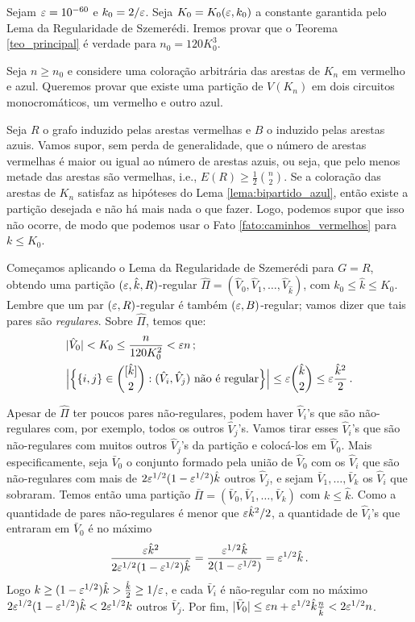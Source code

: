 Sejam $\varepsilon = 10^{-60}$ e $k_0 = 2/\varepsilon$. Seja $K_0 = K_0(\varepsilon, k_0)$ a constante garantida pelo Lema da Regularidade de Szemerédi. Iremos provar que o Teorema \ref{teo_principal} é verdade para $n_0 = 120K_0^3$.

Seja $n\geq n_0$ e considere uma coloração arbitrária das arestas de $K_n$ em vermelho e azul. Queremos provar que existe uma partição de $V(K_n)$ em dois circuitos monocromáticos, um vermelho e outro azul.

Seja $R$ o grafo induzido pelas arestas vermelhas e $B$ o induzido pelas arestas azuis. Vamos supor, sem perda de generalidade, que o número de arestas vermelhas é maior ou igual ao número de arestas azuis, ou seja, que pelo menos metade das arestas são vermelhas, i.e., $E(R)\geq \frac{1}{2}\binom{n}{2}$. 
Se a coloração das arestas de $K_n$ satisfaz as hipóteses do Lema \ref{lema:bipartido_azul}, então existe a partição desejada e não há mais nada o que fazer. Logo, podemos supor que isso não ocorre, de modo que podemos usar o Fato \ref{fato:caminhos_vermelhos} para $k\leq K_0$.

Começamos aplicando o Lema da Regularidade de Szemerédi para $G = R$, obtendo uma partição $(\varepsilon, \hat{k}, R)$-regular $\hat{\Pi} = (\hat{V}_0, \hat{V}_1, \dots, \hat{V}_{\hat{k}})$, com $k_0\leq \hat{k}\leq K_0$. Lembre que um par $(\varepsilon, R)$-regular é também $(\varepsilon, B)$-regular; vamos dizer que tais pares são \emph{regulares}. Sobre $\hat{\Pi}$, temos que:
\begin{align*}
	&|\hat{V}_0|<K_0\leq \frac{n}{120K_0^2}<\varepsilon n\,;\\
	&\Big|\Big\{\{i,j\}\in\binom{[\hat{k}]}{2}: (\hat{V}_i, \hat{V}_j) \text{ não é regular}\Big\}\Big| \leq \varepsilon\binom{\hat{k}}{2}\leq \varepsilon\frac{\hat{k}^2}{2}\,.
\end{align*}


Apesar de $\hat{\Pi}$ ter poucos pares não-regulares, podem haver $\hat{V}_i$'s que são não-regulares com, por exemplo, todos os outros $\hat{V}_j$'s. Vamos tirar esses $\hat{V}_i$'s que são não-regulares com muitos outros $\hat{V}_j$'s da partição e colocá-los em $\hat{V}_0$. Mais especificamente, seja $\bar{V}_0$ o conjunto formado pela união de $\hat{V}_0$ com os $\hat{V}_i$ que são não-regulares com mais de $2\varepsilon^{1/2}(1-\varepsilon^{1/2})\hat{k}$ outros $\hat{V}_j$, e sejam $\bar{V}_1, \dots, \bar{V}_k$ os $\hat{V}_i$ que sobraram. Temos então uma partição $\bar{\Pi} = (\bar{V}_0, \bar{V}_1, \dots, \bar{V}_k)$ com $k\leq \hat{k}$. Como a quantidade de pares não-regulares é menor que $\varepsilon\hat{k}^2/2$, a quantidade de $\hat{V}_i$'s que entraram em $\bar{V}_0$ é no máximo
\[
	\frac{\varepsilon\hat{k}^2}{2\varepsilon^{1/2}(1-\varepsilon^{1/2})\hat{k}} = \frac{\varepsilon^{1/2}\hat{k}}{2(1-\varepsilon^{1/2})} = \varepsilon^{1/2}\hat{k}\,.
\]
Logo $k\geq(1-\varepsilon^{1/2})\hat{k}>\frac{\hat{k}}{2}\geq 1/\varepsilon$, e cada $\bar{V}_i$ é não-regular com no máximo $2\varepsilon^{1/2}(1-\varepsilon^{1/2})\hat{k} < 2\varepsilon^{1/2}k$ outros $\bar{V}_j$. Por fim, $|\bar{V}_0|\leq \varepsilon n + \varepsilon^{1/2}\hat{k}\frac{n}{\hat{k}}<2\varepsilon^{1/2}n$.

